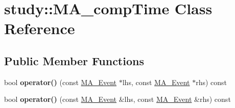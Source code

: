 \hypertarget{classstudy_1_1_m_a__comp_time}{\section{study\+:\+:M\+A\+\_\+comp\+Time Class Reference}
\label{classstudy_1_1_m_a__comp_time}
}
\subsection*{Public Member Functions}
\begin{DoxyCompactItemize}
\item 
\hypertarget{classstudy_1_1_m_a__comp_time_a394450d97602a2684ba6ba95eb7c2213}{bool {\bfseries operator()} (const \hyperlink{classstudy_1_1_m_a___event}{M\+A\+\_\+\+Event} $\ast$lhs, const \hyperlink{classstudy_1_1_m_a___event}{M\+A\+\_\+\+Event} $\ast$rhs) const }\label{classstudy_1_1_m_a__comp_time_a394450d97602a2684ba6ba95eb7c2213}

\item 
\hypertarget{classstudy_1_1_m_a__comp_time_a16a3b2eaa6d7c67dba7641db858828a1}{bool {\bfseries operator()} (const \hyperlink{classstudy_1_1_m_a___event}{M\+A\+\_\+\+Event} \&lhs, const \hyperlink{classstudy_1_1_m_a___event}{M\+A\+\_\+\+Event} \&rhs) const }\label{classstudy_1_1_m_a__comp_time_a16a3b2eaa6d7c67dba7641db858828a1}

\end{DoxyCompactItemize}
